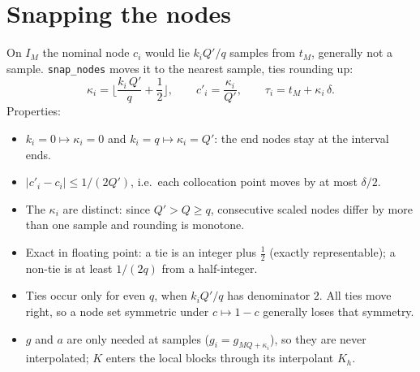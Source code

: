 \documentclass[10pt,a4paper]{article}
\newcommand{\code}[1]{\texttt{\small #1}}
\newcommand{\Qp}{Q'}
\begin{document}
\section{Snapping the nodes}

On $I_M$ the nominal node $c_i$ would lie $k_i\Qp/q$ samples from $t_M$, generally not a sample.
\code{snap\_nodes} moves it to the nearest sample, ties rounding up:
\[
  \kappa_i = \Big\lfloor \frac{k_i\,\Qp}{q} + \frac12 \Big\rfloor,\qquad
  c'_i = \frac{\kappa_i}{\Qp},\qquad
  \tau_i = t_M + \kappa_i\,\delta .
\]
Properties:
\begin{itemize}\setlength\itemsep{1pt}
\item $k_i = 0 \mapsto \kappa_i = 0$ and $k_i = q \mapsto \kappa_i = \Qp$: the end nodes stay at the interval ends.
\item $|c'_i - c_i| \le 1/(2\Qp)$, i.e.\ each collocation point moves by at most $\delta/2$.
\item The $\kappa_i$ are distinct: since $\Qp > Q \ge q$, consecutive scaled nodes differ by more than one sample and rounding is monotone.
\item Exact in floating point: a tie is an integer plus $\tfrac12$ (exactly representable); a non-tie is at least $1/(2q)$ from a half-integer.
\item Ties occur only for even $q$, when $k_i\Qp/q$ has denominator $2$. All ties move right, so a node set symmetric under $c\mapsto 1-c$ generally loses that symmetry.
\item $g$ and $a$ are only needed at samples ($g_i = g_{MQ+\kappa_i}$), so they are never interpolated; $K$ enters the local blocks through its interpolant $K_h$.
\end{itemize}
\end{document}
